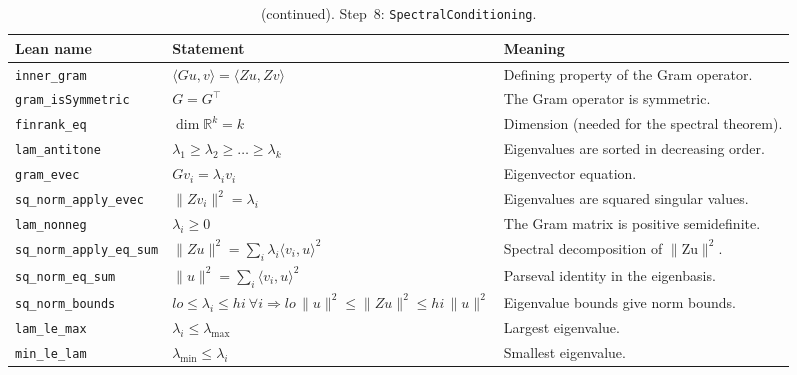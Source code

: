\addtocounter{table}{-1}
{\small
\begin{longtable}{@{}>{\raggedright\arraybackslash}p{3.6cm}>{\raggedright\arraybackslash}p{6.6cm}>{\raggedright\arraybackslash}p{5.6cm}@{}}
\caption[]{(continued). Step~8: \texttt{SpectralConditioning}.}\\
\toprule
Lean name & Statement & Meaning \\
\midrule
\endhead
\texttt{inner\_\allowbreak{}gram} & $\displaystyle \langle Gu,v\rangle=\langle Zu,Zv\rangle$ & Defining property of the Gram operator. \\[3pt]
\texttt{gram\_\allowbreak{}isSymmetric} & $\displaystyle G=G^\top$ & The Gram operator is symmetric. \\[3pt]
\texttt{finrank\_\allowbreak{}eq} & $\displaystyle \dim\mathbb{R}^k=k$ & Dimension (needed for the spectral theorem). \\[3pt]
\texttt{lam\_\allowbreak{}antitone} & $\displaystyle \lambda_1\ge\lambda_2\ge\dots\ge\lambda_k$ & Eigenvalues are sorted in decreasing order. \\[3pt]
\texttt{gram\_\allowbreak{}evec} & $\displaystyle Gv_i=\lambda_iv_i$ & Eigenvector equation. \\[3pt]
\texttt{sq\_\allowbreak{}norm\_\allowbreak{}apply\_\allowbreak{}evec} & $\displaystyle \|Zv_i\|^2=\lambda_i$ & Eigenvalues are squared singular values. \\[3pt]
\texttt{lam\_\allowbreak{}nonneg} & $\displaystyle \lambda_i\ge0$ & The Gram matrix is positive semidefinite. \\[3pt]
\texttt{sq\_\allowbreak{}norm\_\allowbreak{}apply\_\allowbreak{}eq\_\allowbreak{}sum} & $\displaystyle \|Zu\|^2=\sum_i\lambda_i\langle v_i,u\rangle^2$ & Spectral decomposition of $\|$Zu$\|^2$. \\[3pt]
\texttt{sq\_\allowbreak{}norm\_\allowbreak{}eq\_\allowbreak{}sum} & $\displaystyle \|u\|^2=\sum_i\langle v_i,u\rangle^2$ & Parseval identity in the eigenbasis. \\[3pt]
\texttt{sq\_\allowbreak{}norm\_\allowbreak{}bounds} & $\displaystyle lo\le\lambda_i\le hi\ \forall i\Rightarrow lo\,\|u\|^2\le\|Zu\|^2\le hi\,\|u\|^2$ & Eigenvalue bounds give norm bounds. \\[3pt]
\texttt{lam\_\allowbreak{}le\_\allowbreak{}max} & $\displaystyle \lambda_i\le\lambda_{\max}$ & Largest eigenvalue. \\[3pt]
\texttt{min\_\allowbreak{}le\_\allowbreak{}lam} & $\displaystyle \lambda_{\min}\le\lambda_i$ & Smallest eigenvalue. \\[3pt]

\end{longtable}}
